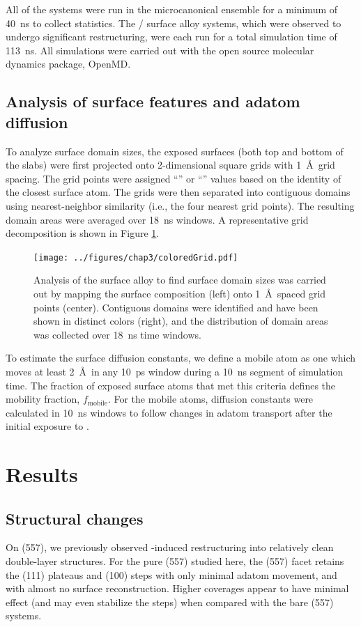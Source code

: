 All of the  systems were run in the microcanonical ensemble for
a minimum of 40~ns to collect statistics. The / surface
alloy systems, which were observed to undergo significant
restructuring, were each run for a total simulation time of 113~ns.
All simulations were carried out with the open source molecular
dynamics package, OpenMD.\citep{openmd, Meineke:2005pt}
 
\subsection{Analysis of surface features and adatom diffusion}
To analyze surface domain sizes, the exposed surfaces (both top and
bottom of the slabs) were first projected onto 2-dimensional square
grids with 1~\AA\ grid spacing. The grid points were assigned
``'' or ``'' values based on the identity of the closest
surface atom.  The grids were then separated into contiguous domains
using nearest-neighbor similarity (i.e., the four nearest grid
points). The resulting domain areas were averaged over 18~ns windows.
A representative grid decomposition is shown in Figure \ref{fig:grid}.

\begin{figure}[p!]
  \texttt{[image: ../figures/chap3/coloredGrid.pdf]}
  \caption{Analysis of the surface alloy to find surface domain sizes
    was carried out by mapping the surface composition (left) onto
    1~\AA\ spaced grid points (center).  Contiguous domains were
    identified and have been shown in distinct colors (right), and the
    distribution of domain areas was collected over 18~ns time
    windows.}
\label{fig:grid}
\end{figure}

To estimate the surface diffusion constants, we define a mobile atom
as one which moves at least 2~\AA\ in any 10~ps window during a 10~ns
segment of simulation time.  The fraction of exposed surface atoms
that met this criteria defines the mobility fraction,
$f_\mathrm{mobile}$.  For the mobile atoms, diffusion constants were
calculated in 10~ns windows to follow changes in adatom transport
after the initial exposure to .

\section{Results}
\subsection{Structural changes}
On (557), we previously observed -induced restructuring
into relatively clean double-layer structures.\citep{Michalka:2013aa} For
the pure (557) studied here, the (557) facet retains the (111)
plateaus and (100) steps with only minimal adatom movement, and with
almost no surface reconstruction.  Higher  coverages appear to
have minimal effect (and may even stabilize the steps) when compared
with the bare (557) systems.

